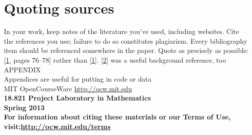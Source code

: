 \documentclass{article}
\begin{document}
\section{Quoting sources}
In your work, keep notes of the literature you’ve used, including
websites. Cite the references you use; failure to do so constitutes plagiarism. Every bibliography item should be referenced somewhere in
the paper. Quote as precisely as possible: [\textcolor{blue}{\url{1}}, pages 76–78] rather than
[\textcolor{blue}{\url{1}}]. [\textcolor{blue}{\url{2}}] was a useful background reference, too\\




\normalsize{APPENDIX}\\
Appendices are useful for putting in code or data\\
\vspace*{0.3cm}
MIT OpenCourseWare
	\textcolor{blue}{\url{http://ocw.mit.edu}}
\vspace*{0.3cm}\\
\bf 18.821 Project Laboratory in Mathematics\\
Spring 2013\\
\vspace*{0.4cm}
For information about citing these materials or our Terms of Use, visit:\textcolor{blue}{\url{http://ocw.mit.edu/terms}}
\end{document}
